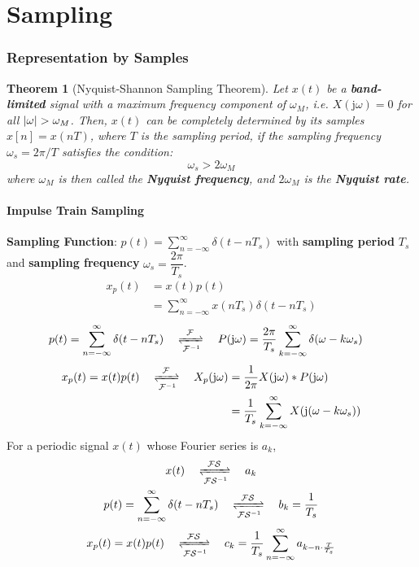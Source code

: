 \documentclass[10pt,UTF8]{article}
\newenvironment{definition box}
{\begin{tcolorbox}[colback=blue!5!white,colframe=blue!75!black,parbox=false,before upper=\par,before lower=\par]}
{\end{tcolorbox}}
\newenvironment{theorem box}
{\begin{tcolorbox}[colback=yellow!5!white,colframe=yellow!75!black,parbox=false,before upper=\par,before lower=\par]}
{\end{tcolorbox}}
\theoremstyle{definition}
\newtheorem{definition inner}{Definition}[section]
\theoremstyle{plain}
\newtheorem{theorem inner}{Theorem}[section]
\newenvironment{theorem}[1][]
{\begin{theorem box}\begin{theorem inner}[#1]\hfill\par}
{\end{theorem inner}\end{theorem box}}
\theoremstyle{definition}
\newtheorem*{proof inner}{\textit{Proof}}
\theoremstyle{remark}
\newcommand{\ju}{\mathrm{j}}  %
\begin{document}
\part*{Sampling}

\section{Representation by Samples}

\begin{theorem}[Nyquist-Shannon Sampling Theorem]
    Let $x(t)$ be a \textbf{band-limited} signal
    with a maximum frequency component of $\omega_M$, i.e.
    $X(\ju\omega) = 0$ for all $\abs{\omega} > \omega_M$.
    Then, $x(t)$ can be completely determined by its samples $x[n] = x(n T)$,
    where $T$ is the sampling period,
    if the sampling frequency $\omega_s=2\pi/T$ satisfies the condition:
    \begin{equation*}
        \omega_s > 2\omega_M
    \end{equation*}
    where $\omega_M$ is then called the \textbf{Nyquist frequency},
    and $2\omega_M$ is the \textbf{Nyquist rate}.
\end{theorem}

\subsection{Impulse Train Sampling}

\textbf{Sampling Function}: \quad
$\displaystyle p(t) = \sum_{n=-\infty}^{\infty} \delta(t-n T_s)$
\qquad with \textbf{sampling period} $T_s$
and \textbf{sampling frequency} $\omega_s = \dfrac{2\pi}{T_s}$.
\begin{align*}
    x_p(t) &= x(t) p(t) \\
    &= \sum_{n=-\infty}^{\infty} x(n T_s) \delta(t-n T_s)
\end{align*}
\begin{align*}
    p(t) = \sum_{n=-\infty}^{\infty} \delta(t-n T_s)
    \quad\xrightleftharpoons[\mathcal{F}^{-1}]{\mathcal{F}}\quad
    P(\ju\omega) &= \frac{2\pi}{T_s} \sum_{k=-\infty}^{\infty} \delta\qty(\omega - k \omega_s)
\end{align*}
\begin{align*}
    x_p(t) = x(t) p(t)
    \quad\xrightleftharpoons[\mathcal{F}^{-1}]{\mathcal{F}}\quad
    X_p(\ju\omega) &= \frac{1}{2\pi} X(\ju\omega) \ast P(\ju\omega) \\
    &= \frac{1}{T_s} \sum_{k=-\infty}^{\infty} X\qty(\ju\qty(\omega - k \omega_s)) \\
\end{align*}
For a periodic signal $x(t)$ whose Fourier series is $a_k$,
\begin{gather*}
    x(t)
    \quad\xrightleftharpoons[\mathcal{FS}^{-1}]{\mathcal{FS}}\quad
    a_k \\
    p(t) = \sum_{n=-\infty}^{\infty} \delta(t-n T_s)
    \quad\xrightleftharpoons[\mathcal{FS}^{-1}]{\mathcal{FS}}\quad
    b_k = \frac{1}{T_s} \\
    x_p(t) = x(t) p(t)
    \quad\xrightleftharpoons[\mathcal{FS}^{-1}]{\mathcal{FS}}\quad
    c_k = \frac{1}{T_s} \sum_{n=-\infty}^{\infty} a_{k - n \cdot \frac{T}{T_s}}
\end{gather*}
\end{document}
